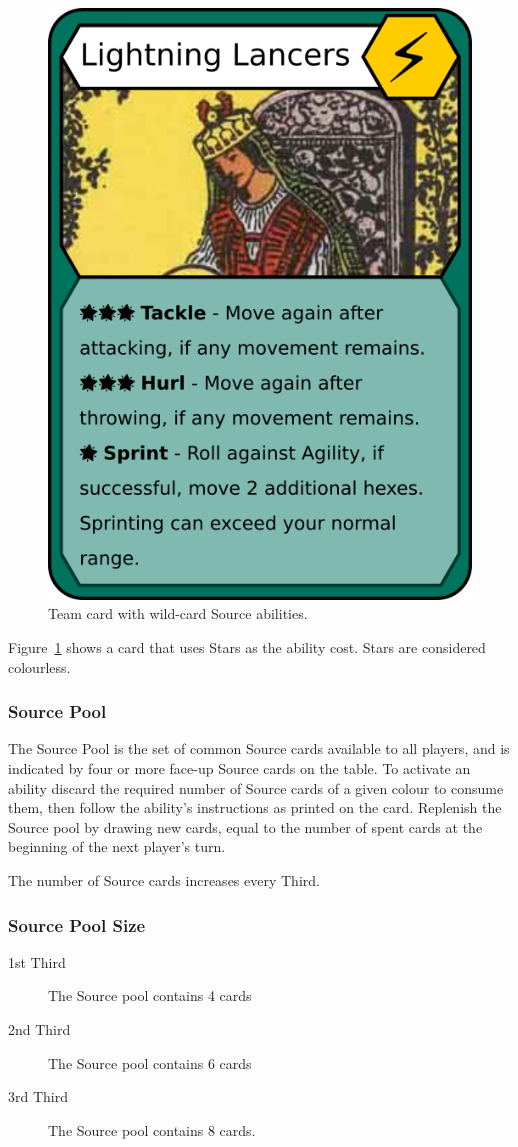 \begin{figure}
    \centering
    \includegraphics{the-game/yellow-team.png}
    \caption{Team card with wild-card Source abilities.}
    \label{fig:ability-example-2}
\end{figure}

Figure~\ref{fig:ability-example-2} shows a card that uses Stars as the ability cost.
Stars are considered colourless.
\subsubsection{Source Pool}
The Source Pool is the set of common Source cards available to all players, and is indicated by four or more face-up Source cards on the table.
To activate an ability discard the required number of Source cards of a given colour to consume them, then follow the ability's instructions as printed on the card.
Replenish the Source pool by drawing new cards, equal to the number of spent cards at the beginning of the next player's turn.

The number of Source cards increases every Third.
\subsubsection{Source Pool Size}
\begin{description}
    \item[1st Third] The Source pool contains 4 cards
    \item[2nd Third] The Source pool contains 6 cards
    \item[3rd Third] The Source pool contains 8 cards.
\end{description}